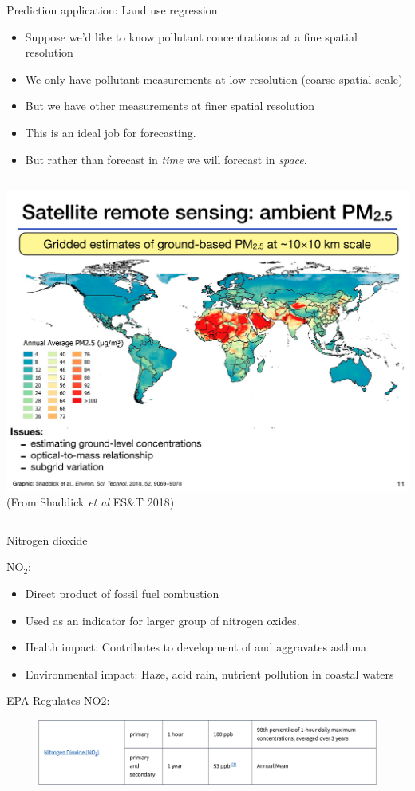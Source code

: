\documentclass[aspectratio=169]{beamer}
\begin{document}
\begin{frame}{Prediction application: Land use regression}
  \begin{itemize}
    \item Suppose we'd like to know pollutant concentrations at a fine spatial resolution
    \item We only have pollutant measurements at low resolution (coarse spatial scale)
    \item But we have other measurements at finer spatial resolution
    \item This is an ideal job for forecasting.  
    \item But rather than forecast in \textit{time} we will forecast in \textit{space}.
  \end{itemize}

\begin{columns}
\includegraphics[width = \textwidth]{pm2_5_LUR_Shaddick.pdf}
(From Shaddick \textit{et al} ES\&T 2018)
\end{columns}
\end{frame}

\begin{frame}{Nitrogen dioxide}

NO$_2$:
\begin{itemize}
\item Direct product of fossil fuel combustion
\item Used as an indicator for larger group of nitrogen oxides.
\item Health impact: Contributes to development of and aggravates asthma 
\item Environmental impact: Haze, acid rain, nutrient pollution in coastal waters
\end{itemize}

EPA Regulates NO2:
\begin{figure}
\includegraphics[width=\textwidth]{EPA_NO2_reg}
\end{figure}
\end{frame}
\end{document}
